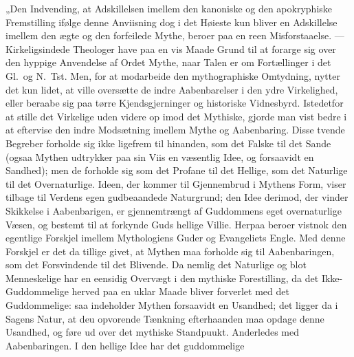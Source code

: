 \documentclass[12pt,a4paper]{book}
\begin{document}
„Den Indvending, at Adskillelsen imellem den kanoniske og den apokryphiske Fremstilling
ifølge denne Anviisning dog i det Høieste kun bliver en Adskillelse imellem den ægte og
den forfeilede Mythe, beroer paa en reen Misforstaaelse. --- Kirkeligsindede Theologer
have paa en vis Maade Grund til at forarge sig over den hyppige Anvendelse af Ordet
Mythe, naar Talen er om Fortællinger i det Gl.\ og N.\ Tst. Men, for at modarbeide den
mythographiske Omtydning, nytter det kun lidet, at ville oversætte de indre
Aabenbarelser i den ydre Virkelighed, eller beraabe sig paa tørre Kjendsgjerninger og
historiske Vidnesbyrd. Istedetfor at stille det Virkelige uden videre op imod det
Mythiske, gjorde man vist bedre i at eftervise den indre Modsætning imellem Mythe og
Aabenbaring. Disse tvende Begreber forholde sig ikke ligefrem til hinanden, som det
Falske til det Sande (ogsaa Mythen udtrykker paa sin Viis en væsentlig Idee, og
forsaavidt en Sandhed); men de forholde sig
som det Profane til det Hellige, som det Naturlige til det Overnaturlige. Ideen, der
kommer til Gjennembrud i Mythens Form, viser tilbage til Verdens egen gudbeaandede
Naturgrund; den Idee derimod, der vinder Skikkelse i Aabenbarigen, er gjennemtrængt af
Guddommens eget overnaturlige Væsen, og bestemt til at forkynde Guds hellige Villie.
Herpaa beroer vistnok den egentlige Forskjel imellem Mythologiens Guder og Evangeliets
Engle. Med denne Forskjel er det da tillige givet, at Mythen maa forholde sig til
Aabenbaringen, som det Forsvindende til det Blivende. Da nemlig det Naturlige og blot
Menneskelige har en eensidig Overvægt i den mythiske Forestilling, da det
Ikke-Guddommelige herved paa en uklar Maade bliver forverlet med det Guddommelige: saa
indeholder Mythen forsaavidt en Usandhed; det ligger da i Sagens Natur, at deu opvorende
Tænkning efterhaanden maa opdage denne Usandhed, og føre ud over det mythiske
Standpuukt. Anderledes med Aabenbaringen. I den hellige Idee har det guddommelige
\end{document}
